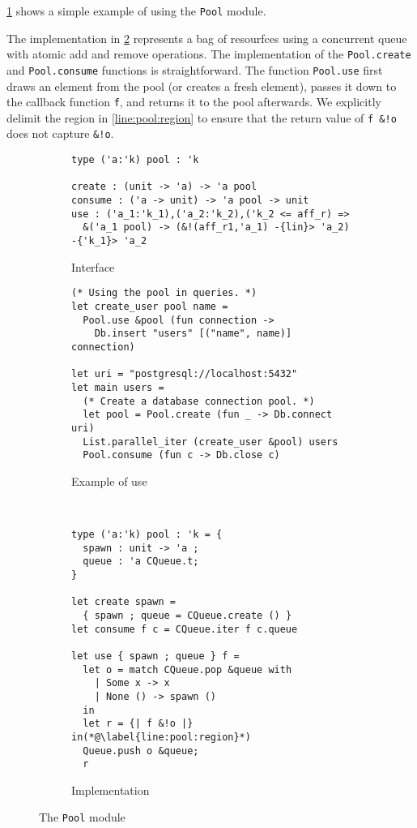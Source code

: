 \cref{ex:pool} shows a simple example of using the \lstinline/Pool/ module.

The implementation in \cref{impl:pool} represents a bag of resourfces
using a concurrent queue with atomic add and remove operations. 
The implementation of the \lstinline/Pool.create/ and \lstinline/Pool.consume/
functions is straightforward.
The function \lstinline/Pool.use/ first draws
an element from the pool (or creates a fresh element),
passes it down to the callback function \lstinline/f/, and returns
it to the pool afterwards.
We explicitly delimit the region in \cref{line:pool:region} to ensure that
the return value of \lstinline/f &!o/ does not capture \lstinline/&!o/.

\begin{figure}[tp]
  \centering
  \begin{subfigure}[t]{.55\linewidth}
\begin{lstlisting}
type ('a:'k) pool : 'k

create : (unit -> 'a) -> 'a pool
consume : ('a -> unit) -> 'a pool -> unit
use : ('a_1:'k_1),('a_2:'k_2),('k_2 <= aff_r) =>
  &('a_1 pool) -> (&!(aff_r1,'a_1) -{lin}> 'a_2) -{'k_1}> 'a_2
\end{lstlisting}
    \caption{Interface}
    \label{intf:pool}

\begin{lstlisting}
(* Using the pool in queries. *)
let create_user pool name =
  Pool.use &pool (fun connection ->
    Db.insert "users" [("name", name)] connection)
 
let uri = "postgresql://localhost:5432"
let main users =
  (* Create a database connection pool. *)
  let pool = Pool.create (fun _ -> Db.connect uri)
  List.parallel_iter (create_user &pool) users
  Pool.consume (fun c -> Db.close c)
\end{lstlisting}
    \caption{Example of use}
    \label{ex:pool}
  \end{subfigure}~
  \begin{subfigure}[t]{.45\linewidth}
\begin{lstlisting}
type ('a:'k) pool : 'k = {
  spawn : unit -> 'a ;
  queue : 'a CQueue.t;
}

let create spawn =
  { spawn ; queue = CQueue.create () }
let consume f c = CQueue.iter f c.queue

let use { spawn ; queue } f =
  let o = match CQueue.pop &queue with
    | Some x -> x
    | None () -> spawn ()
  in
  let r = {| f &!o |} in(*@\label{line:pool:region}*)
  Queue.push o &queue;
  r
\end{lstlisting}
    \caption{Implementation}
    \label{impl:pool}
  \end{subfigure}

  \caption{The \texttt{Pool} module}
  \label{fig:pool}
\end{figure}


